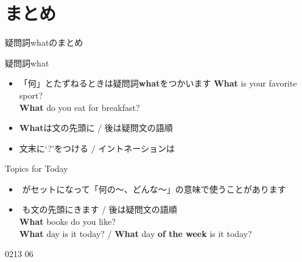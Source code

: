 \documentclass[aspectratio=169,xcolor={dvipsnames,table}]{beamer}
\begin{document}
\section{まとめ}
\begin{frame}[plain]{疑問詞whatのまとめ}

\begin{block}{疑問詞what }
\begin{itemize}[square]\small
 \item \<「何」とたずねるときは疑問詞\textbf{what}をつかいます%
\hfill{\scriptsize \textbf{What} is your favorite sport?}\\
\hfill{\scriptsize \textbf{What} do you eat for breakfast?}
 \item \textbf{What}は文の先頭に / 後は疑問文の語順
 \item   文末に`?'をつける / イントネーションは\myDownwardPitch{}
\end{itemize}
     \end{block}

\begin{block}{Topics for Today}
\begin{itemize}[square]\small
 \item {}\,\,がセットになって「何の〜、どんな～」の意味で使うことがあります
 \item {}\,\,も文の先頭にきます / 後は疑問文の語順\\
\hfill{\scriptsize \textbf{What} books do you like?}\\
\hfill{\scriptsize \textbf{What} day is it today? / \textbf{What} day \textbf{of the week} is it today?}
\end{itemize}
     \end{block}

\hfill{\tiny 0213}\,{\tiny {}\,06}\end{frame}
\end{document}
